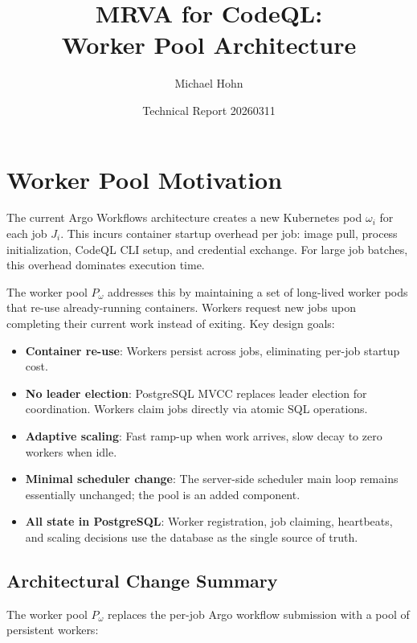 \documentclass[11pt]{article}
\title{MRVA for CodeQL:\\Worker Pool Architecture}
\author{Michael Hohn}
\date{Technical Report 20260311}
\begin{document}
\maketitle
\tableofcontents

\section{Worker Pool Motivation}

The current Argo Workflows architecture creates a new Kubernetes pod $\omega_i$ for
each job $J_i$. This incurs container startup overhead per job: image pull, process
initialization, CodeQL CLI setup, and credential exchange. For large job batches, this
overhead dominates execution time.

The worker pool $P_\omega$ addresses this by maintaining a set of long-lived worker
pods that re-use already-running containers. Workers request new jobs upon completing
their current work instead of exiting. Key design goals:

\begin{itemize}
\item \textbf{Container re-use}: Workers persist across jobs, eliminating per-job
  startup cost.
\item \textbf{No leader election}: PostgreSQL MVCC replaces leader election for
  coordination. Workers claim jobs directly via atomic SQL operations.
\item \textbf{Adaptive scaling}: Fast ramp-up when work arrives, slow decay to zero
  workers when idle.
\item \textbf{Minimal scheduler change}: The server-side scheduler main loop remains
  essentially unchanged; the pool is an added component.
\item \textbf{All state in PostgreSQL}: Worker registration, job claiming, heartbeats,
  and scaling decisions use the database as the single source of truth.
\end{itemize}

\subsection{Architectural Change Summary}

The worker pool $P_\omega$ replaces the per-job Argo workflow submission with a
pool of persistent workers:
\end{document}
